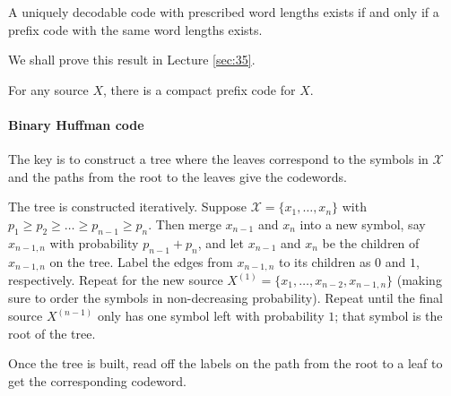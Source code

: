 \documentclass[a4paper, 11pt, openany]{book}
\begin{document}
\begin{theorem}
A uniquely decodable code with prescribed word lengths exists if and only if a prefix code with the same word lengths exists.
\end{theorem}

We shall prove this result in Lecture \ref{sec:35}.

\begin{corollary}
For any source $X$, there is a compact prefix code for $X$.
\end{corollary}


\paragraph{Binary Huffman code}


The key is to construct a tree where the leaves correspond to the symbols in  $\mathcal{X}$ and the paths from the root to the leaves give the codewords.

The tree is constructed iteratively. Suppose $\mathcal{X} = \{x_1, \dots, x_n\}$ with $p_1 \ge p_2 \ge  \dots \ge p_{n-1} \ge p_n$. Then merge $x_{n-1}$ and $x_n$ into a new symbol, say $x_{n-1, n}$ with probability $p_{n-1} + p_n$, and let $x_{n-1}$ and $x_n$ be the children of $x_{n-1, n}$ on the tree. Label the edges from $x_{n-1, n}$ to its children as $0$ and $1$, respectively. Repeat for the new source $X^{(1)} = \{x_1, \dots, x_{n-2}, x_{n-1, n} \}$ (making sure to order the symbols in non-decreasing probability). Repeat until the final source $X^{(n-1)}$ only has one symbol left with probability $1$; that symbol is the root of the tree.

Once the tree is built, read off the labels on the path from the root to a leaf to get the corresponding codeword.
\end{document}

